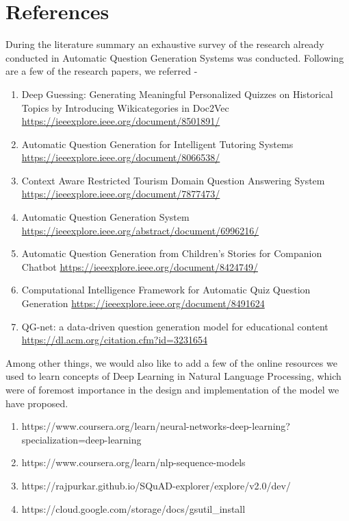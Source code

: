 \chapter{References}

During the literature summary an exhaustive survey of the research already
conducted in Automatic Question Generation Systems was conducted. Following are
a few of the research papers, we referred - 

\begin{enumerate}

\item Deep Guessing: Generating Meaningful Personalized Quizzes on Historical
Topics by Introducing Wikicategories in Doc2Vec \url{https://ieeexplore.ieee.org/document/8501891/}

\item Automatic Question Generation for Intelligent Tutoring Systems \url{https://ieeexplore.ieee.org/document/8066538/}

\item Context Aware Restricted Tourism Domain Question Answering System \url{https://ieeexplore.ieee.org/document/7877473/}

\item Automatic Question Generation System \url{https://ieeexplore.ieee.org/abstract/document/6996216/}

\item Automatic Question Generation from Children’s Stories for Companion
Chatbot \url{https://ieeexplore.ieee.org/document/8424749/}

\item Computational Intelligence Framework for Automatic Quiz Question
Generation \url{https://ieeexplore.ieee.org/document/8491624}

\item QG-net: a data-driven question generation model for educational content
\url{https://dl.acm.org/citation.cfm?id=3231654}

\end{enumerate}

Among other things, we would also like to add a few of the online resources we
used to learn concepts of Deep Learning in Natural Language Processing, which
were of foremost importance in the design and implementation of the model we
have proposed. 

\begin{enumerate}

\item
https://www.coursera.org/learn/neural-networks-deep-learning?specialization=deep-learning

\item https://www.coursera.org/learn/nlp-sequence-models

\item https://rajpurkar.github.io/SQuAD-explorer/explore/v2.0/dev/

\item https://cloud.google.com/storage/docs/gsutil\_install

\end{enumerate}

